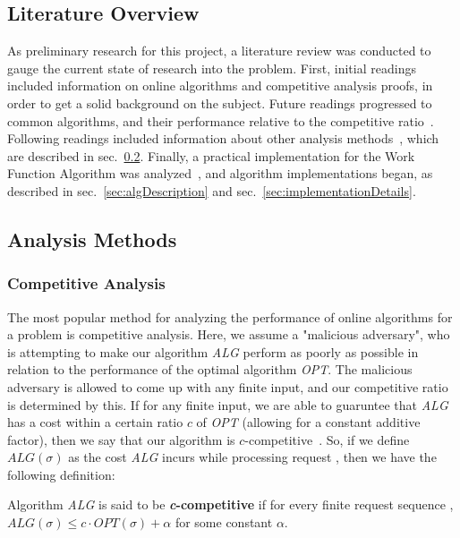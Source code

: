 \subsection{Literature Overview}
\label{sec:lit}
As preliminary research for this project, a literature review was conducted to gauge the current state of research into the \KS problem. First, initial readings included information on online algorithms and competitive analysis proofs, in order to get a solid background on the subject. Future readings progressed to common \KS algorithms, and their performance relative to the competitive ratio~\cite{OnlineComp1998}. Following readings included information about other analysis methods~\cite{MAXMAX2005, bij2016}, which are described in sec.~\ref{sec:AM}. Finally, a practical implementation for the Work Function Algorithm was analyzed~\cite{WFA2009}, and algorithm implementations began, as described in sec.~\ref{sec:algDescription} and sec.~\ref{sec:implementationDetails}.


\subsection{Analysis Methods}
\label{sec:AM}

\subsubsection*{Competitive Analysis}
\label{sec:Comp}
The most popular method for analyzing the performance of online algorithms for a problem is competitive analysis. Here, we assume a "malicious adversary", who is attempting to make our algorithm \textit{ALG} perform as poorly as possible in relation to the performance of the optimal algorithm \textit{OPT}. The malicious adversary is allowed to come up with any finite input, and our competitive ratio is determined by this. If for any finite input, we are able to guaruntee that \textit{ALG} has a cost within a certain ratio $c$ of \textit{OPT} (allowing for a constant additive factor), then we say that our algorithm is $c$-competitive~\cite{OnlineComp1998}. So, if we define $ALG(\sigma)$ as the cost \textit{ALG} incurs while processing request \s, then we have the following definition: 

\begin{definition}
\label{def:comp}
Algorithm \textit{ALG} is said to be \textbf{\textit{c}-competitive} if for every finite request sequence \s, $ALG(\sigma) \leq c\cdot OPT(\sigma)+\alpha$ for some constant $\alpha$.
\end{definition}

